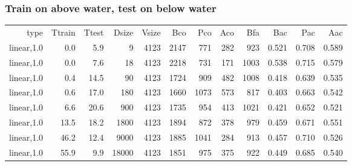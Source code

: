 \subsubsection{Train on above water, test on below water}
\begin{longtable}{r|r|r|r|r|r|r|r|r|r|r|r}
          type &  Ttrain &   Ttest & Dsize & Vsize &   Bco &   Pco &   Aco &   Bfa &   Bac &   Pac &   Aac \\
    linear,1.0 &     0.0 &     5.9 &     9 &  4123 &  2147 &   771 &   282 &   923 & 0.521 & 0.708 & 0.589 \\
    linear,1.0 &     0.0 &     7.6 &    18 &  4123 &  2218 &   731 &   171 &  1003 & 0.538 & 0.715 & 0.579 \\
    linear,1.0 &     0.4 &    14.5 &    90 &  4123 &  1724 &   909 &   482 &  1008 & 0.418 & 0.639 & 0.535 \\
    linear,1.0 &     0.6 &    17.0 &   180 &  4123 &  1660 &  1073 &   573 &   817 & 0.403 & 0.663 & 0.542 \\
    linear,1.0 &     6.6 &    20.6 &   900 &  4123 &  1735 &   954 &   413 &  1021 & 0.421 & 0.652 & 0.521 \\
    linear,1.0 &    13.5 &    18.2 &  1800 &  4123 &  1894 &   872 &   378 &   979 & 0.459 & 0.671 & 0.551 \\
    linear,1.0 &    46.2 &    12.4 &  9000 &  4123 &  1885 &  1041 &   284 &   913 & 0.457 & 0.710 & 0.526 \\
    linear,1.0 &    55.9 &     9.9 & 18000 &  4123 &  1851 &   975 &   375 &   922 & 0.449 & 0.685 & 0.540 
\end{longtable}
\fi

